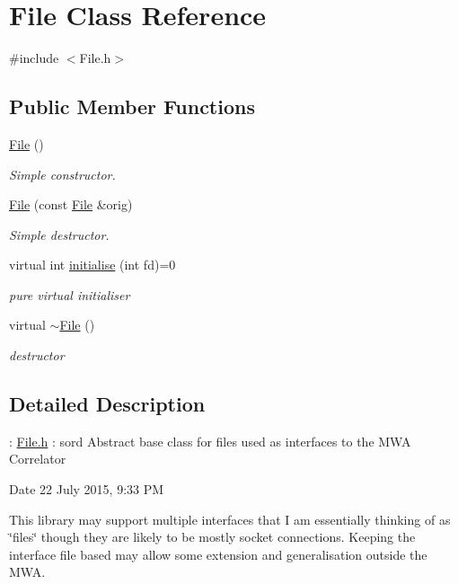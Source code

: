 \hypertarget{class_file}{}\section{File Class Reference}
\label{class_file}


{\ttfamily \#include $<$File.\+h$>$}

\subsection*{Public Member Functions}
\begin{DoxyCompactItemize}
\item 
\hypertarget{class_file_ae039af5807fc385f41b60644725d15d0}{}\hyperlink{class_file_ae039af5807fc385f41b60644725d15d0}{File} ()\label{class_file_ae039af5807fc385f41b60644725d15d0}

\begin{DoxyCompactList}\small\item\em Simple constructor. \end{DoxyCompactList}\item 
\hypertarget{class_file_a1e667576d9822d58b19a71542755c95d}{}\hyperlink{class_file_a1e667576d9822d58b19a71542755c95d}{File} (const \hyperlink{class_file}{File} \&orig)\label{class_file_a1e667576d9822d58b19a71542755c95d}

\begin{DoxyCompactList}\small\item\em Simple destructor. \end{DoxyCompactList}\item 
virtual int \hyperlink{class_file_ac0d287d91b41266d92f4a5d9029af4c7}{initialise} (int fd)=0
\begin{DoxyCompactList}\small\item\em pure virtual initialiser \end{DoxyCompactList}\item 
\hypertarget{class_file_ac704ebdf5f57d7a1c5ddf409d797fb69}{}virtual \hyperlink{class_file_ac704ebdf5f57d7a1c5ddf409d797fb69}{$\sim$\+File} ()\label{class_file_ac704ebdf5f57d7a1c5ddf409d797fb69}

\begin{DoxyCompactList}\small\item\em destructor \end{DoxyCompactList}\end{DoxyCompactItemize}


\subsection{Detailed Description}
\+: \hyperlink{_file_8h_source}{File.\+h} \+: sord  Abstract base class for files used as interfaces to the M\+W\+A Correlator \begin{DoxyDate}{Date}
22 July 2015, 9\+:33 P\+M
\end{DoxyDate}
This library may support multiple interfaces that I am essentially thinking of as \char`\"{}files\char`\"{} though they are likely to be mostly socket connections. Keeping the interface file based may allow some extension and generalisation outside the M\+W\+A. 

